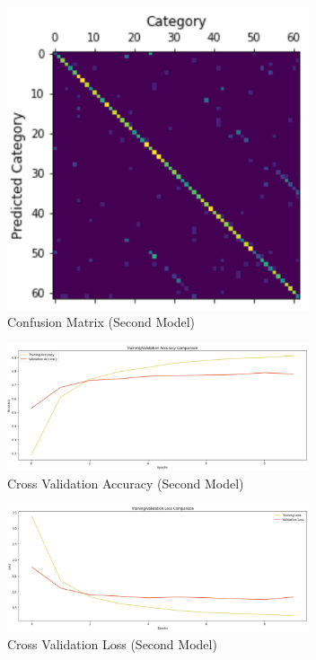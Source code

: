 \documentclass[conference]{IEEEtran}
\begin{document}
\begin{figure}[H]
    \centering
    \includegraphics[width=3.5in]{pictures/model2_confmatrix.png}
    \caption{Confusion Matrix (Second Model)}\label{fig:example4}
\end{figure}

\begin{figure}[H]
    \centering
    \includegraphics[width=3.5in]{pictures/model2_accuracy.png}
    \caption{Cross Validation Accuracy (Second Model)}\label{fig:example4}
\end{figure}

\begin{figure}[H]
    \centering
    \includegraphics[width=3.5in]{pictures/model2_loss.png}
    \caption{Cross Validation Loss (Second Model)}\label{fig:example4}
\end{figure}
\end{document}
